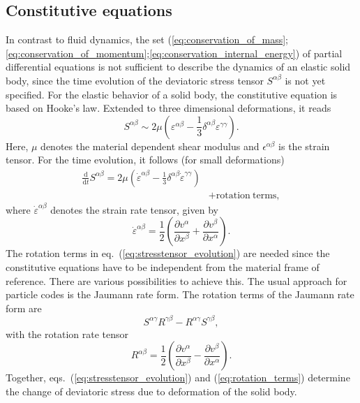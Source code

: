 \documentclass[10pt,fleqn,twoside]{article}
\begin{document}
\subsection{Constitutive equations}
In contrast to fluid dynamics, the set
(\ref{eq:conservation_of_mass};\ref{eq:conservation_of_momentum};\ref{eq:conservation_internal_energy}) of partial
differential equations is not sufficient to describe the dynamics of an elastic solid body, since the time evolution of
the deviatoric stress tensor $S^{\alpha \beta}$ is not yet specified. For the elastic behavior of a solid body, the
constitutive equation is based on Hooke's law. Extended to three dimensional deformations, it reads
%
\begin{equation}
S^{\alpha \beta} \sim 2 \mu \left( \varepsilon^{\alpha \beta} - \frac{1}{3} \delta^{\alpha \beta} \varepsilon^{\gamma
\gamma} \right).
\end{equation}
%
Here, $\mu$ denotes the material dependent shear modulus and $\epsilon^{\alpha \beta}$ is the strain tensor.
%
For the time evolution, it follows (for small deformations)
%
\begin{align}
\label{eq:stresstensor_evolution}
\frac{\mathrm{d}}{\mathrm{d}t}S^{\alpha \beta} =  2\mu \left( \dot{\varepsilon}^{\alpha \beta} - \frac{1}{3}
\delta^{\alpha \beta} \dot{\varepsilon}^{\gamma \gamma} \right)   &  \\  & +  \mathrm{rotation~terms,} \nonumber
\end{align}
%
%
where $\dot{\varepsilon}^{\alpha \beta}$ denotes the strain rate tensor, given by
\begin{equation}
\label{eq:strain_rate_tensor}
\dot{\varepsilon}^{\alpha \beta} = \frac{1}{2} \left( \frac{\partial v^\alpha}{\partial x^\beta} + \frac{\partial
v^\beta}{\partial x^\alpha} \right).
\end{equation}
%
The rotation terms in eq.~(\ref{eq:stresstensor_evolution}) are needed since the constitutive equations have to be
independent from the material frame of reference. There are various possibilities to achieve this. The usual approach
for particle codes is the Jaumann rate form. The rotation terms
of the Jaumann rate form are
%
\begin{equation}
\label{eq:rotation_terms}
S^{\alpha \gamma} R^{\gamma \beta} - R^{\alpha \gamma} S^{\gamma \beta},
\end{equation}
%
with the rotation rate tensor
%
\begin{equation}
R^{\alpha \beta} = \frac{1}{2} \left( \frac{\partial v^\alpha}{\partial x^\beta} - \frac{\partial v^\beta}{\partial x^\alpha}
\right).
\end{equation}
%
Together, eqs.~(\ref{eq:stresstensor_evolution}) and (\ref{eq:rotation_terms}) determine the change of deviatoric
stress due to deformation of the solid body.
%
\end{document}
